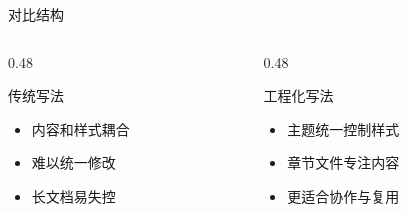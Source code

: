 \begin{frame}{对比结构}
  \begin{columns}[T]
    \begin{column}{0.48\textwidth}
      \begin{alertblock}{传统写法}
        \begin{itemize}
          \item 内容和样式耦合
          \item 难以统一修改
          \item 长文档易失控
        \end{itemize}
      \end{alertblock}
    \end{column}
    \begin{column}{0.48\textwidth}
      \begin{exampleblock}{工程化写法}
        \begin{itemize}
          \item 主题统一控制样式
          \item 章节文件专注内容
          \item 更适合协作与复用
        \end{itemize}
      \end{exampleblock}
    \end{column}
  \end{columns}
\end{frame}
